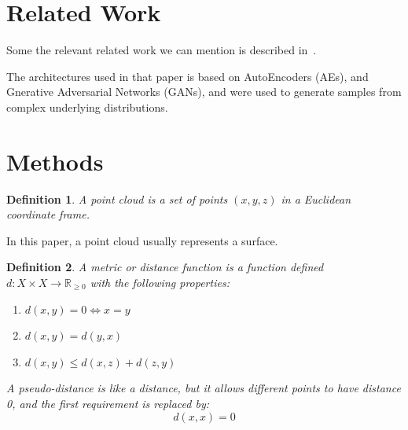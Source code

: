 \documentclass[12pt]{article}
\newtheorem{definition}{Definition}
\newcommand{\contentdescription}[1]{}
\begin{document}
    \section{Related Work}
    \contentdescription{
        Related Work (5-15\%):
        Discuss the published work related to your project paper, the types of experiments you do and the additional method that you have added to this work or you have compared this paper with (if any).
    }

    Some the relevant related work we can mention is described in~\cite{arxiv:1612.00593}.

    The architectures used in that paper is based on AutoEncoders (AEs)\cite{doi:10.5555/65669.104451}\cite{arxiv:1312.6114},
    and Gnerative Adversarial Networks (GANs)\cite{NIPS2014_5ca3e9b1}\cite{arxiv:1511.06434}\cite{arxiv:1612.02136},
    and were used to generate samples from complex underlying distributions.


    \section{Methods}
    \contentdescription{
        Methods (15-25\%):
        Describe the original paper's method to the extent that you would need to make your report and findings understandable.
        Otherwise, here you can describe other methods that you compare with or other methods that you apply on top of what you reimplemented.
        Here, you also try to justify any methodical modification or incremental changes that you have added to the original paper.
        It may be helpful to include figures, diagrams, or tables to describe your method or compare it with other methods.
    }

    \begin{definition}
        A \emph{point cloud} is a set of points $(x, y, z)$ in a Euclidean coordinate frame.
    \end{definition}

    In this paper, a point cloud usually represents a surface.

    \begin{definition}
        A \emph{metric} or \emph{distance function} is a function defined
        $d: X \times X \to \mathbb{R}_{\geq 0}$
        with the following properties:

        \begin{enumerate}
            \item $d(x,y) = 0 \Leftrightarrow x = y$
            \item $d(x,y) = d(y,x)$
            \item $d(x,y) \leq d(x,z) + d(z,y)$
        \end{enumerate}

        A \emph{pseudo-distance} is like a distance, but it allows different points to have distance 0, and the first requirement is replaced by:
        \[d(x,x) = 0\]
    \end{definition}
\end{document}
